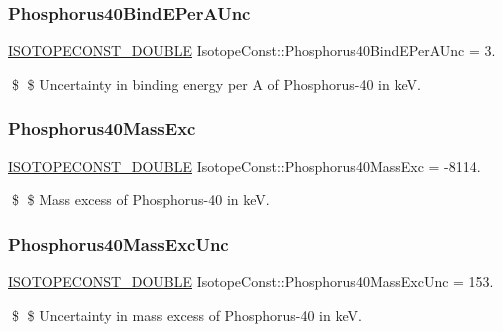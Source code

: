 \subsubsection{\texorpdfstring{Phosphorus40\+Bind\+E\+Per\+A\+Unc}{Phosphorus40BindEPerAUnc}}
{\footnotesize\ttfamily \mbox{\hyperlink{group___isotope_const-_macros_ga8f45a7272ce02c0b4c65c44636ed719a}{I\+S\+O\+T\+O\+P\+E\+C\+O\+N\+S\+T\+\_\+\+D\+O\+U\+B\+LE}} Isotope\+Const\+::\+Phosphorus40\+Bind\+E\+Per\+A\+Unc = 3.}

\$ \$ Uncertainty in binding energy per A of Phosphorus-\/40 in keV. \mbox{\label{group___isotope_const-_phosphorus-_p40_ga9feaf737d3e586edb2eb8c8419e57362}} 
\subsubsection{\texorpdfstring{Phosphorus40\+Mass\+Exc}{Phosphorus40MassExc}}
{\footnotesize\ttfamily \mbox{\hyperlink{group___isotope_const-_macros_ga8f45a7272ce02c0b4c65c44636ed719a}{I\+S\+O\+T\+O\+P\+E\+C\+O\+N\+S\+T\+\_\+\+D\+O\+U\+B\+LE}} Isotope\+Const\+::\+Phosphorus40\+Mass\+Exc = -\/8114.}

\$ \$ Mass excess of Phosphorus-\/40 in keV. \mbox{\label{group___isotope_const-_phosphorus-_p40_ga44d2eb524718dd21c60ead1dedf4de2e}} 
\subsubsection{\texorpdfstring{Phosphorus40\+Mass\+Exc\+Unc}{Phosphorus40MassExcUnc}}
{\footnotesize\ttfamily \mbox{\hyperlink{group___isotope_const-_macros_ga8f45a7272ce02c0b4c65c44636ed719a}{I\+S\+O\+T\+O\+P\+E\+C\+O\+N\+S\+T\+\_\+\+D\+O\+U\+B\+LE}} Isotope\+Const\+::\+Phosphorus40\+Mass\+Exc\+Unc = 153.}

\$ \$ Uncertainty in mass excess of Phosphorus-\/40 in keV. \mbox{\label{group___isotope_const-_phosphorus-_p40_ga2fc24d0d91eb379df4e6e2c95815c245}} 

